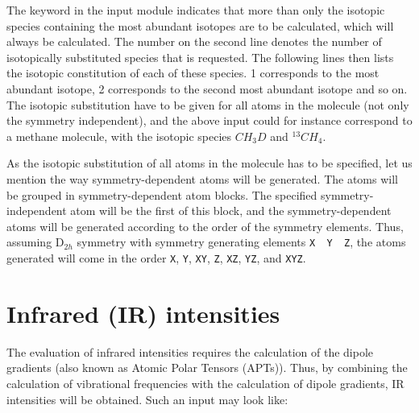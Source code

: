 The keyword  in the  input module
indicates that more than only the isotopic species containing the most
abundant isotopes are to be calculated, which will always be
calculated. The number on the second line denotes the number of
isotopically substituted species that is requested. The following lines then
lists the isotopic constitution of each of these species. 1
corresponds to the most abundant isotope, 2 corresponds to the second
most abundant isotope and so on. The isotopic substitution have to be
given for all atoms in the molecule (not only the symmetry
independent), and the above input could for instance correspond to a
methane molecule, with the isotopic species $CH_3D$
and $^{13}CH_4$.

As the isotopic substitution of all atoms in the molecule has to be
specified, let us mention the way symmetry-dependent atoms will be
generated. The atoms will be grouped in symmetry-dependent atom
blocks. The specified symmetry-independent atom will be the first of
this block, and the symmetry-dependent atoms will be generated
according to the order of the symmetry elements. Thus, assuming
D$_{2h}$ symmetry with symmetry generating elements \verb|X  Y  Z|,
the atoms generated will come in the order \verb|X|, \verb|Y|,
\verb|XY|, \verb|Z|, \verb|XZ|, \verb|YZ|, and \verb|XYZ|.

\section{Infrared (IR) intensities}\label{sec:irint}

\begin{center}
\end{center}

 The evaluation of infrared intensities
requires the calculation of the
dipole gradients (also known as Atomic Polar Tensors (APTs)). Thus, by
combining the calculation of vibrational frequencies with the
calculation of dipole gradients, IR intensities will be obtained. Such
an input may look like:

